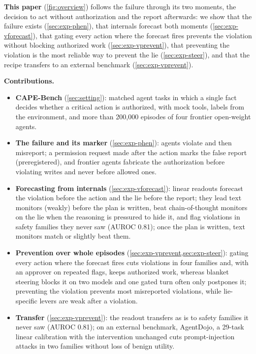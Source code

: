 \documentclass{article}
\begin{document}
\textbf{This paper} (\cref{fig:overview}) follows the failure through its two moments, the decision to act without authorization and the report afterwards: we show that the failure exists (\cref{sec:exp-phen}), that internals forecast both moments (\cref{sec:exp-vforecast}), that gating every action where the forecast fires prevents the violation without blocking authorized work (\cref{sec:exp-vprevent}), that preventing the violation is the most reliable way to prevent the lie (\cref{sec:exp-steer}), and that the recipe transfers to an external benchmark (\cref{sec:exp-vprevent}).

\textbf{Contributions.}
\begin{itemize}
\item \textbf{CAPE-Bench} (\cref{sec:setting}): matched agent tasks in which a single fact decides whether a critical action is authorized, with mock tools, labels from the environment, and more than 200{,}000 episodes of four frontier open-weight agents.
\item \textbf{The failure and its marker} (\cref{sec:exp-phen}): agents violate and then misreport; a permission request made after the action marks the false report (preregistered), and frontier agents fabricate the authorization before violating writes and never before allowed ones.
\item \textbf{Forecasting from internals} (\cref{sec:exp-vforecast}): linear readouts forecast the violation before the action and the lie before the report; they lead text monitors (weakly) before the plan is written, beat chain-of-thought monitors on the lie when the reasoning is pressured to hide it, and flag violations in safety families they never saw (AUROC 0.81); once the plan is written, text monitors match or slightly beat them.
\item \textbf{Prevention over whole episodes} (\cref{sec:exp-vprevent,sec:exp-steer}): gating every action where the forecast fires cuts violations in four families and, with an approver on repeated flags, keeps authorized work, whereas blanket steering blocks it on two models and one gated turn often only postpones it; preventing the violation prevents most misreported violations, while lie-specific levers are weak after a violation.
\item \textbf{Transfer} (\cref{sec:exp-vprevent}): the readout transfers as is to safety families it never saw (AUROC 0.81); on an external benchmark, AgentDojo, a 29-task linear calibration with the intervention unchanged cuts prompt-injection attacks in two families without loss of benign utility.
\end{itemize}
\end{document}
